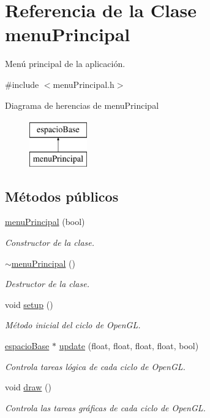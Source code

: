 \hypertarget{classmenu_principal}{}\section{Referencia de la Clase menu\+Principal}
\label{classmenu_principal}


Menú principal de la aplicación.  




{\ttfamily \#include $<$menu\+Principal.\+h$>$}

Diagrama de herencias de menu\+Principal\begin{figure}[H]
\begin{center}
\leavevmode
\includegraphics[height=2.000000cm]{classmenu_principal}
\end{center}
\end{figure}
\subsection*{Métodos públicos}
\begin{DoxyCompactItemize}
\item 
\hyperlink{classmenu_principal_a52d757f677ea4f87a1def3a2259e3052}{menu\+Principal} (bool)
\begin{DoxyCompactList}\small\item\em Constructor de la clase. \end{DoxyCompactList}\item 
\hyperlink{classmenu_principal_aec2f0d44f0cd26e5c9ddfea5141ba0a1}{$\sim$menu\+Principal} ()
\begin{DoxyCompactList}\small\item\em Destructor de la clase. \end{DoxyCompactList}\item 
void \hyperlink{classmenu_principal_af392d4bbd2d1851b565441ed9dccbae8}{setup} ()
\begin{DoxyCompactList}\small\item\em Método inicial del ciclo de Open\+G\+L. \end{DoxyCompactList}\item 
\hyperlink{classespacio_base}{espacio\+Base} $\ast$ \hyperlink{classmenu_principal_a69aa5c82d822246305ec9eb0ae60b546}{update} (float, float, float, float, bool)
\begin{DoxyCompactList}\small\item\em Controla tareas lógica de cada ciclo de Open\+G\+L. \end{DoxyCompactList}\item 
void \hyperlink{classmenu_principal_ac76c28146574b4b72364cb877b5cd83f}{draw} ()
\begin{DoxyCompactList}\small\item\em Controla las tareas gráficas de cada ciclo de Open\+G\+L. \end{DoxyCompactList}\end{DoxyCompactItemize}
